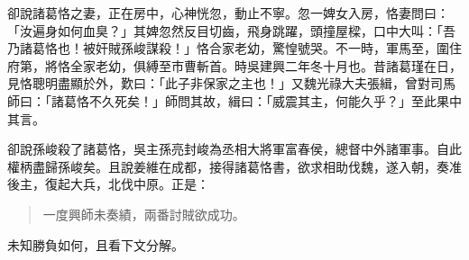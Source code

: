 卻說諸葛恪之妻，正在房中，心神恍忽，動止不寧。忽一婢女入房，恪妻問曰：「汝遍身如何血臭？」其婢忽然反目切齒，飛身跳躍，頭撞屋樑，口中大叫：「吾乃諸葛恪也！被奸賊孫峻謀殺！」恪合家老幼，驚惶號哭。不一時，軍馬至，圍住府第，將恪全家老幼，俱縛至市曹斬首。時吳建興二年冬十月也。昔諸葛瑾在日，見恪聰明盡顯於外，歎曰：「此子非保家之主也！」又魏光祿大夫張緝，曾對司馬師曰：「諸葛恪不久死矣！」師問其故，緝曰：「威震其主，何能久乎？」至此果中其言。

卻說孫峻殺了諸葛恪，吳主孫亮封峻為丞相大將軍富春侯，總督中外諸軍事。自此權柄盡歸孫峻矣。且說姜維在成都，接得諸葛恪書，欲求相助伐魏，遂入朝，奏准後主，復起大兵，北伐中原。正是：

\begin{quote}
一度興師未奏績，兩番討賊欲成功。
\end{quote}

未知勝負如何，且看下文分解。
